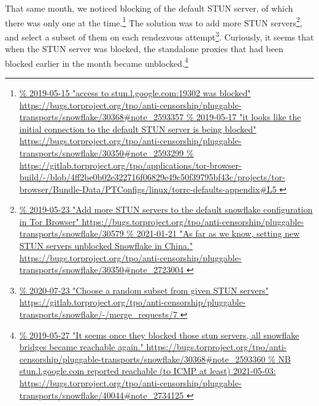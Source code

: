 \documentclass[letterpaper,twocolumn]{article}
\newlength{\urlfootnotesize}
\newcommand{\urlfootnote}[1]{\footnote{
\raggedright\hangindent\footnotemargin%
\fontsize{\urlfootnotesize}{\urlfootnotesize}\selectfont%
\url{#1}
}}
\begin{document}
That same month, we noticed blocking of
the default STUN server,
of which there was only one at the time.\urlfootnote{
https://bugs.torproject.org/tpo/anti-censorship/pluggable-transports/snowflake/30368\#note_2593357
}
The solution was to add more STUN servers\urlfootnote{
https://bugs.torproject.org/tpo/anti-censorship/pluggable-transports/snowflake/30579
},
and select a subset of them on each rendezvous attempt\urlfootnote{
https://gitlab.torproject.org/tpo/anti-censorship/pluggable-transports/snowflake/-/merge_requests/7
}.
Curiously, it seems that when the STUN server was blocked,
the standalone proxies that had been blocked earlier in the month became unblocked.\urlfootnote{
https://bugs.torproject.org/tpo/anti-censorship/pluggable-transports/snowflake/30368\#note_2593360
}
\end{document}
